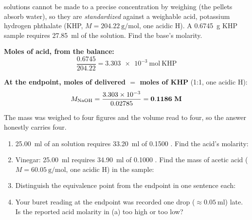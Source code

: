 \documentclass{apchem-worksheet}
\begin{document}
\begin{workedexample}
 solutions cannot be made to a precise concentration by weighing
(the pellets absorb water), so they are \emph{standardized} against a
weighable acid, potassium hydrogen phthalate (KHP,
$M = \SI{204.22}{\gram\per\mole}$, one acidic H). A \SI{0.6745}{\gram}
KHP sample requires \SI{27.85}{\milli\litre} of the  solution.
Find the base's molarity.

\textbf{Moles of acid, from the balance:}
\[ \frac{0.6745}{204.22} = \SI{3.303e-3}{\mole}~\text{KHP} \]

\textbf{At the endpoint, moles of  delivered $=$ moles of KHP}
(1:1, one acidic H):
\[ M_{\ce{NaOH}} = \frac{3.303\times10^{-3}}{0.02785}
   = \mathbf{0.1186~M} \]

The mass was weighed to four figures and the volume read to four, so the
answer honestly carries four.
\end{workedexample}

\begin{yourturn}
\begin{enumerate}[leftmargin=*,itemsep=0.5em]
  \item \SI{25.00}{\milli\litre} of an  solution requires
        \SI{33.20}{\milli\litre} of \SI{0.1500}{\Molar} . Find
        the acid's molarity: \workspace[2cm]
  \item Vinegar: \SI{25.00}{\milli\litre} requires
        \SI{34.90}{\milli\litre} of \SI{0.1000}{\Molar} . Find
        the mass of acetic acid ($M = \SI{60.05}{\gram\per\mole}$, one
        acidic H) in the sample: \workspace[2cm]
  \item Distinguish the equivalence point from the endpoint in one
        sentence each: \workspace[1.8cm]
  \item Your buret reading at the endpoint was recorded one drop
        ($\approx\SI{0.05}{\milli\litre}$) late. Is the reported acid
        molarity in (a) too high or too low? \workspace[1.6cm]
\end{enumerate}
\end{yourturn}
\end{document}
